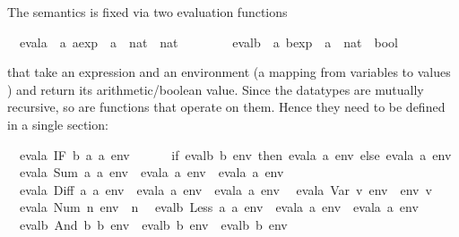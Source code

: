 \begin{isabellebody}
\begin{isamarkuptext}
The semantics is fixed via two evaluation functions%
\end{isamarkuptext}%
\ \ evala\ {\isacharcolon}{\isacharcolon}\ {\isachardoublequote}{\isacharprime}a\ aexp\ {\isasymRightarrow}\ {\isacharparenleft}{\isacharprime}a\ {\isasymRightarrow}\ nat{\isacharparenright}\ {\isasymRightarrow}\ nat{\isachardoublequote}\isanewline
\ \ \ \ \ \ \ \ evalb\ {\isacharcolon}{\isacharcolon}\ {\isachardoublequote}{\isacharprime}a\ bexp\ {\isasymRightarrow}\ {\isacharparenleft}{\isacharprime}a\ {\isasymRightarrow}\ nat{\isacharparenright}\ {\isasymRightarrow}\ bool{\isachardoublequote}%
\begin{isamarkuptext}%
\noindent
that take an expression and an environment (a mapping from variables  to values
) and return its arithmetic/boolean
value. Since the datatypes are mutually recursive, so are functions that
operate on them. Hence they need to be defined in a single 
section:%
\end{isamarkuptext}%
\isanewline
\ \ {\isachardoublequote}evala\ {\isacharparenleft}IF\ b\ a\ a\ env\ {\isacharequal}\isanewline
\ \ \ \ \ {\isacharparenleft}if\ evalb\ b\ env\ then\ evala\ a\ env\ else\ evala\ a\ env{\isacharparenright}{\isachardoublequote}\isanewline
\ \ {\isachardoublequote}evala\ {\isacharparenleft}Sum\ a\ a\ env\ {\isacharequal}\ evala\ a\ env\ {\isacharplus}\ evala\ a\ env{\isachardoublequote}\isanewline
\ \ {\isachardoublequote}evala\ {\isacharparenleft}Diff\ a\ a\ env\ {\isacharequal}\ evala\ a\ env\ {\isacharminus}\ evala\ a\ env{\isachardoublequote}\isanewline
\ \ {\isachardoublequote}evala\ {\isacharparenleft}Var\ v{\isacharparenright}\ env\ {\isacharequal}\ env\ v{\isachardoublequote}\isanewline
\ \ {\isachardoublequote}evala\ {\isacharparenleft}Num\ n{\isacharparenright}\ env\ {\isacharequal}\ n{\isachardoublequote}\isanewline
\isanewline
\ \ {\isachardoublequote}evalb\ {\isacharparenleft}Less\ a\ a\ env\ {\isacharequal}\ {\isacharparenleft}evala\ a\ env\ {\isacharless}\ evala\ a\ env{\isacharparenright}{\isachardoublequote}\isanewline
\ \ {\isachardoublequote}evalb\ {\isacharparenleft}And\ b\ b\ env\ {\isacharequal}\ {\isacharparenleft}evalb\ b\ env\ {\isasymand}\ evalb\ b\ env{\isacharparenright}{\isachardoublequote}\isanewline

\end{isabellebody}
